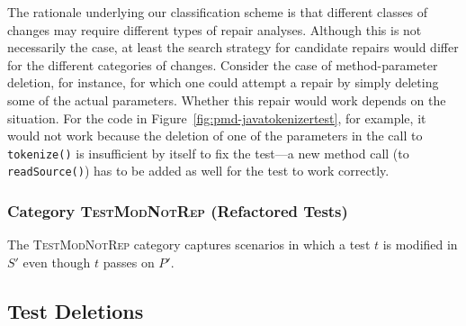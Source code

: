 \documentclass[conference]{IEEEtran}
\newcommand{\lang}[1]{\texttt{\small #1}}
\newcommand{\subject}[1]{\texttt{\small #1}}
\newcommand{\catref}{\textsc{TestModNotRep}}
\begin{document}
The rationale underlying our classification scheme is that different
classes of changes may require different types of repair analyses.
Although this is not necessarily the case, at least the search
strategy for candidate repairs would differ for the different
categories of changes. Consider the case of method-parameter deletion,
for instance, for which one could attempt a repair by simply deleting
some of the actual parameters. Whether this repair would work depends
on the situation. For the code in
Figure~\ref{fig:pmd-javatokenizertest}, for example, it would not work
because the deletion of one of the parameters in the call to
\lang{tokenize()} is insufficient by itself to fix the test---a new
method call (to \lang{readSource()}) has to be added as well for the
test to work correctly.

\subsubsection{Category \catref{} (Refactored Tests)}
\label{sec:category-c2}

The \catref{} category captures scenarios in which a test $t$ is
modified in $S'$ even though $t$ passes on $P'$.



\subsection{Test Deletions}
\label{sec:test-ref}
\end{document}
